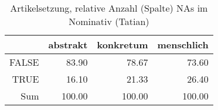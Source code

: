 \begin{table}[ht]
\centering
\begin{tabular}{rrrr}
  \hline
 & abstrakt & konkretum & menschlich \\ 
  \hline
FALSE & 83.90 & 78.67 & 73.60 \\ 
  TRUE & 16.10 & 21.33 & 26.40 \\ 
  Sum & 100.00 & 100.00 & 100.00 \\ 
   \hline
\end{tabular}
\caption{Artikelsetzung, relative Anzahl (Spalte) NAs im Nominativ (Tatian)} 
\end{table}
